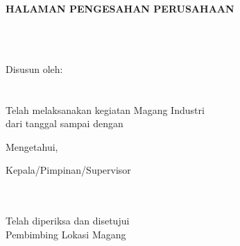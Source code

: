 \newpage

\begin{center}
    \begin{doublespace}
        \textbf{\large \MakeUppercase{Halaman Pengesahan Perusahaan \\ {\tipe}}}
    \end{doublespace}
\end{center}

\begin{center}
    \textbf{\large \MakeUppercase {\normalsize{\judulid}}} \\
    \textbf{\large \MakeUppercase {\normalsize{\tempat}}} \\ [5cm]
\end{center}

\begin{center}
    Disusun oleh:\\
    \textbf{\underline{\penulis}}\\
    \textbf{\nim}\\[4cm]

    Telah melaksanakan kegiatan Magang Industri \\
    dari tanggal \textbf{\tglMulai} sampai dengan \textbf{\tglSelesai} \\ [2cm]
\end{center}

\begin{center}
    Mengetahui, \\[1cm]
\end{center}
\begin{minipage}{0.45\textwidth}
    Kepala/Pimpinan/Supervisor\\
    \tempat\\[2cm]
    \underline{\pimpinanPerusahaan}\\
    \jabatanPimpinan
\end{minipage}%
\hfill
 \begin{minipage}{0.35\textwidth}
    Telah diperiksa dan disetujui \\
    Pembimbing Lokasi Magang \\[2cm]
    \underline{\pembimbingPerusahaan}\\
    \jabatanPembimbing
\end{minipage}